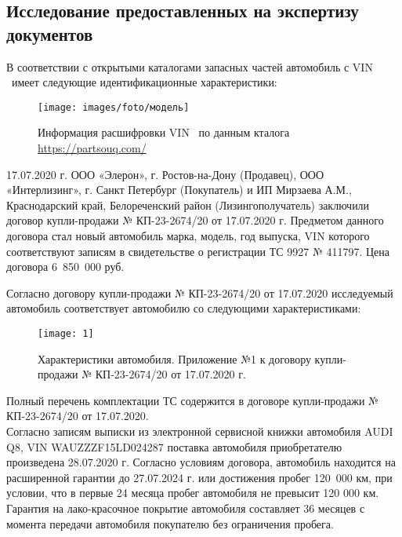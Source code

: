 \subsection{Исследование предоставленных на экспертизу документов}
%

В соответствии с открытыми каталогами запасных частей  автомобиль с VIN \vin \ имеет следующие идентификационные характеристики:

\begin{figure}[H]
	\centering
	\texttt{[image: images/foto/модель]}
	\caption{Информация расшифровки VIN \vin \ по данным кталога \url{https://partsouq.com/}}
	\label{vin}
\end{figure}
%
17.07.2020 г. ООО «Элерон», г. Ростов-на-Дону (Продавец), ООО «Интерлизинг», г. Санкт Петербург (Покупатель) и ИП Мирзаева А.М., Краснодарский край, Белореченский район (Лизингополучатель) заключили договор купли-продажи № КП-23-2674/20 от 17.07.2020 г. Предметом данного договора стал новый автомобиль марка, модель, год выпуска, VIN которого соответствуют записям в свидетельстве о регистрации ТС 9927 № 411797. Цена договора 6 850 000 руб.

Согласно договору купли-продажи № КП-23-2674/20 от 17.07.2020 исследуемый автомобиль  соответствует  автомобилю со следующими характеристиками:\\

\begin{figure}[H]
	\centering
	\texttt{[image: 1]}
	\caption{Характеристики автомобиля.  Приложение №1 к договору купли-продажи № КП-23-2674/20 от 17.07.2020 г.}
	\label{vin}
\end{figure}

Полный перечень комплектации ТС содержится в договоре купли-продажи № КП-23-2674/20 от 17.07.2020.\\
Согласно  записям  выписки из электронной сервисной книжки автомобиля AUDI Q8, VIN  WAUZZZF15LD024287 поставка автомобиля приобретателю произведена   28.07.2020 г. Согласно условиям договора, автомобиль находится на расширенной гарантии до 27.07.2024 г. или достижения  пробег 120 000 км, при условии, что в первые 24 месяца пробег автомобиля не превысит 120 000 км. Гарантия на лако-красочное покрытие автомобиля составляет 36 месяцев с момента передачи автомобиля покупателю без ограничения пробега.\\[3mm]


